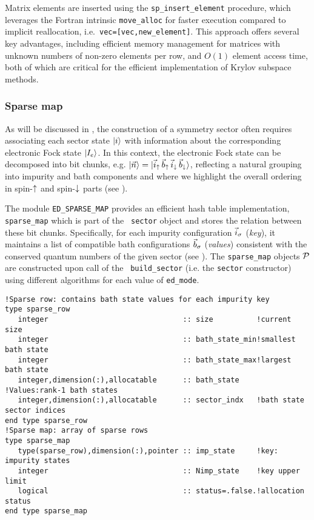 \documentclass[edipack_sp.tex]{subfiles}
\begin{document}
Matrix elements are inserted using the 
{\tt sp\_insert\_element} procedure, which leverages the Fortran 
intrinsic {\tt move\_alloc} for faster execution compared to 
implicit reallocation, i.e.~{\tt vec=[vec,new\_element]}. 
%
This approach offers several key advantages, including efficient 
memory management for matrices with unknown numbers of non-zero 
elements per row, and $O(1)$ element access time, both of which 
are critical for the efficient implementation of Krylov subspace 
methods.



\subsubsection{Sparse map}\label{CodeSparseMap}
As will be discussed in , the construction of a symmetry 
sector often requires associating each sector state $|i\rangle$ with 
information about the corresponding electronic Fock state $|I_e\rangle$. 
In this context, the electronic Fock state can be decomposed into bit chunks, 
e.g. $|\vec{n}\rangle = |\vec{i}_\uparrow\,\vec{b}_\uparrow\,
\vec{i}_\downarrow\,\vec{b}_\downarrow\rangle$, reflecting a natural grouping into impurity 
and bath components and where we highlight the overall ordering in
spin-$\uparrow$ and spin-$\downarrow$ parts (see ).

The module {\tt ED\_SPARSE\_MAP} provides an efficient hash table 
implementation, {\tt sparse\_map} which is part of the {\tt
  sector} object and stores the relation between these bit chunks. 
Specifically, for each impurity configuration 
$\vec{i}_\sigma$ ({\it key}), it maintains a list of compatible bath 
configurations $\vec{b}_\sigma$ ({\it values}) consistent with the conserved 
quantum numbers of the given sector (see ).
The {\tt sparse\_map} objects ${\cal P}$ are constructed upon call of the {\tt
  build\_sector} (i.e. the {\tt sector} constructor) using different algorithms 
for each value of {\tt ed\_mode}.


\begin{lstlisting}[style=fstyle,numbers=none]
!Sparse row: contains bath state values for each impurity key 
type sparse_row
   integer                               :: size          !current size
   integer                               :: bath_state_min!smallest bath state
   integer                               :: bath_state_max!largest bath state
   integer,dimension(:),allocatable      :: bath_state    !Values:rank-1 bath states
   integer,dimension(:),allocatable      :: sector_indx   !bath state sector indices
end type sparse_row
!Sparse map: array of sparse rows 
type sparse_map
   type(sparse_row),dimension(:),pointer :: imp_state     !key: impurity states
   integer                               :: Nimp_state    !key upper limit 
   logical                               :: status=.false.!allocation status
end type sparse_map
\end{lstlisting}
\end{document}
